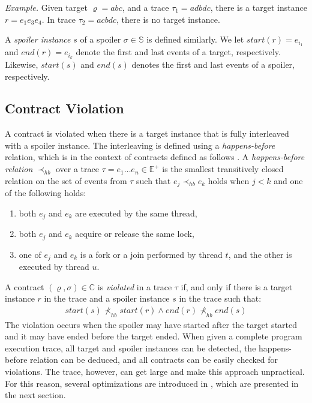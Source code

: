 \emph{Example.} Given target $\varrho = abc$, and a trace $\tau_1 = adbdc$,
there is a target instance $r = e_1 e_3 e_4$. In trace $\tau_2 = acbdc$, there
is no target instance.

A \emph{spoiler instance} $s$ of a spoiler $\sigma \in \mathbb{S}$ is defined
similarly. We let $start(r) = e_{i_1}$ and $end(r) = e_{i_k}$ denote the first
and last events of a target, respectively. Likewise, $start(s)$ and $end(s)$
denotes the first and last events of a spoiler, respectively.

\subsection{Contract Violation}

A contract is violated when there is a target instance that is fully interleaved
with a spoiler instance. The interleaving is defined using a
\emph{happens-before} relation, which is in the context of contracts defined as
follows \cite{contracts}. A \emph{happens-before relation} $\prec_{hb}$ over a
trace $\tau = e_1 \ldots e_n \in \mathbb{E}^+$ is the smallest transitively
closed relation on the set of events from $\tau$ such that $e_j \prec_{hb} e_k$
holds when $j < k$ and one of the following holds:
\begin{enumerate}
    \item both $e_j$ and $e_k$ are executed by the same thread,
    \item both $e_j$ and $e_k$ acquire or release the same lock,
    \item one of $e_j$ and $e_k$ is a fork or a join performed by thread $t$,
        and the other is executed by thread $u$.
\end{enumerate}

A contract $(\varrho,\sigma) \in \mathbb{C}$ is \emph{violated} in a trace
$\tau$ if, and only if there is a target instance $r$ in the trace and a spoiler
instance $s$ in the trace such that:
\begin{align*}
    start(s) \nprec_{hb} start(r) \wedge end(r) \nprec_{hb} end(s)
\end{align*}
The violation occurs when the spoiler may have started after the target started
and it may have ended before the target ended. When given a complete program
execution trace, all target and spoiler instances can be detected, the
happens-before relation can be deduced, and all contracts can be easily checked
for violations. The trace, however, can get large and make this approach
unpractical. For this reason, several optimizations are introduced in
\cite{contracts}, which are presented in the next section.

